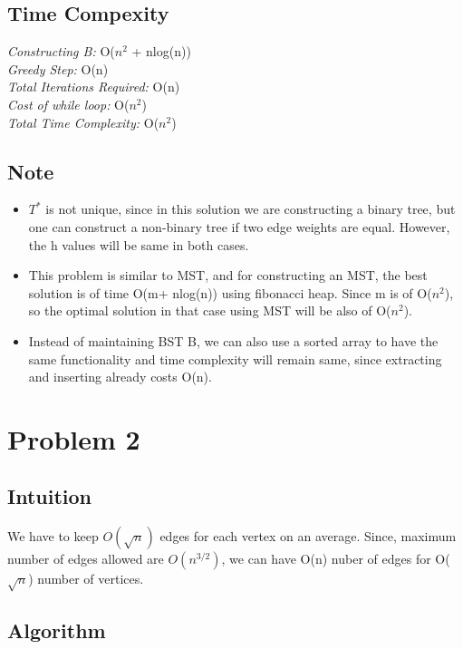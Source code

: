 \documentclass{article}
\begin{document}
\subsection{Time Compexity}
\emph{Constructing B:} O($n^2$ + nlog(n))\\
\emph{Greedy Step:} O(n)\\
\emph{Total Iterations Required:} O(n)\\
\emph{Cost of while loop:} O($n^2$)\\
\emph{Total Time Complexity: } O($n^2$)

\subsection{Note}
\begin{itemize}
\item $T^*$ is not unique, since in this solution we are constructing a binary tree, but one can construct a non-binary tree if two edge weights are equal. However, the h values will be same in both cases.
\item This problem is similar to MST, and for constructing an MST, the best solution is of time O(m+ nlog(n)) using fibonacci heap. Since m is of O($n^2$), so the optimal solution in that case using MST will be also of O($n^2$).
\item Instead of maintaining BST B, we can also use a sorted array to have the same functionality and time complexity will remain same, since extracting and inserting already costs O(n).
\end{itemize}

\section{Problem 2}
\subsection{Intuition}
We have to keep $O(\sqrt{n})$ edges for each vertex on an average. Since, maximum number of edges allowed are $O(n^{3/2})$, we can have O(n) nuber of edges for O($\sqrt{n}$) number of vertices.

\subsection{Algorithm}
\end{document}
